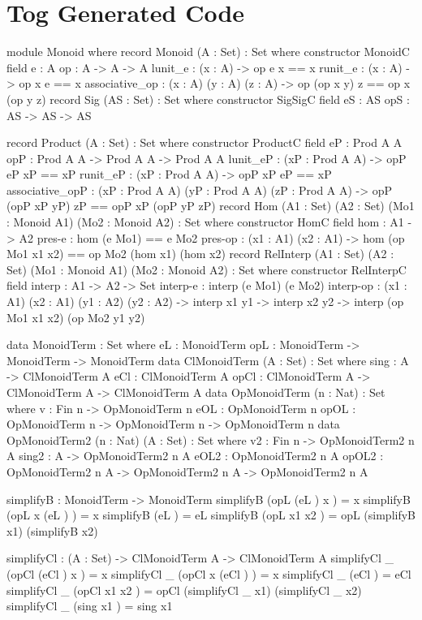 \chapter{Tog Generated Code}
\label{appendix:generatedTog}

\begin{togcode} 
module Monoid  where
  record Monoid (A : Set) : Set where
   constructor MonoidC
   field
     e : A
     op : A -> A -> A
     lunit_e : (x : A) -> op e x == x
     runit_e : (x : A) -> op x e == x
     associative_op : (x : A) (y : A) (z : A) -> 
                      op (op x y) z == op x (op y z)
  record Sig (AS : Set) : Set where
   constructor SigSigC
   field
     eS : AS
     opS : AS -> AS -> AS
\end{togcode} 
\begin{togcode}      
  record Product (A : Set) : Set where
   constructor ProductC
   field
     eP : Prod A A
     opP : Prod A A -> Prod A A -> Prod A A
     lunit_eP : (xP : Prod A A) -> opP eP xP == xP
     runit_eP : (xP : Prod A A) -> opP xP eP == xP
     associative_opP : (xP : Prod A A) (yP : Prod A A) (zP : Prod A A) -> 
                       opP (opP xP yP) zP == opP xP (opP yP zP)
  record Hom (A1 : Set) (A2 : Set) 
             (Mo1 : Monoid A1) (Mo2 : Monoid A2) : Set where
   constructor HomC
   field
     hom : A1 -> A2
     pres-e : hom (e Mo1) == e Mo2
     pres-op : (x1 : A1) (x2 : A1) -> 
               hom (op Mo1 x1 x2) == op Mo2 (hom x1) (hom x2)
  record RelInterp (A1 : Set) (A2 : Set) 
              (Mo1 : Monoid A1) (Mo2 : Monoid A2) : Set where
   constructor RelInterpC
   field
     interp : A1 -> A2 -> Set
     interp-e : interp (e Mo1) (e Mo2)
     interp-op : (x1 : A1) (x2 : A1) (y1 : A2) (y2 : A2) -> 
                    interp x1 y1 -> interp x2 y2 -> 
                    interp (op Mo1 x1 x2) (op Mo2 y1 y2)
\end{togcode} 
\begin{togcode}                     
  data MonoidTerm : Set where
    eL : MonoidTerm
    opL : MonoidTerm -> MonoidTerm -> MonoidTerm
  data ClMonoidTerm (A : Set) : Set where
    sing : A -> ClMonoidTerm A
    eCl : ClMonoidTerm A
    opCl : ClMonoidTerm A -> ClMonoidTerm A -> ClMonoidTerm A
  data OpMonoidTerm (n : Nat) : Set where
    v : Fin n -> OpMonoidTerm n
    eOL : OpMonoidTerm n
    opOL : OpMonoidTerm n -> OpMonoidTerm n -> OpMonoidTerm n
  data OpMonoidTerm2 (n : Nat) (A : Set) : Set where
    v2 : Fin n -> OpMonoidTerm2 n A
    sing2 : A -> OpMonoidTerm2 n A
    eOL2 : OpMonoidTerm2 n A
    opOL2 : OpMonoidTerm2 n A -> OpMonoidTerm2 n A -> OpMonoidTerm2 n A
 
  simplifyB : MonoidTerm -> MonoidTerm
  simplifyB (opL (eL ) x ) = x
  simplifyB (opL x (eL ) ) = x
  simplifyB (eL ) = eL
  simplifyB (opL x1 x2 ) = opL (simplifyB x1) (simplifyB x2)
    
  simplifyCl : (A : Set) -> ClMonoidTerm A -> ClMonoidTerm A
  simplifyCl _ (opCl (eCl ) x ) = x
  simplifyCl _ (opCl x (eCl ) ) = x
  simplifyCl _ (eCl ) = eCl
  simplifyCl _ (opCl x1 x2 ) = opCl (simplifyCl _ x1) (simplifyCl _ x2)
  simplifyCl _ (sing x1 ) = sing x1
\end{togcode} 
